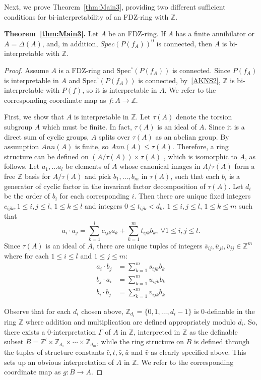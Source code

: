 \documentclass{article}
\theoremstyle{remark}
\def\Z{{\mathbb{Z}}}
\def\Spec{\text{Spec}}
\begin{document}
Next, we prove Theorem~\ref{thm:Main3}, providing two different sufficient conditions for bi-interpretability of an FDZ-ring with $\Z$.
\medskip


\noindent \textbf{Theorem~\ref{thm:Main3}.} Let $A$ be an FDZ-ring. If $A$ has a finite annihilator or $A=\Delta(A)$, and, in addition, $Spec(P(f_A))^0$ is connected, then $A$ is bi-interpretable with $\Z$.
\begin{proof} Assume $A$ is a FDZ-ring and $\Spec^\circ(P(f_A))$ is connected. Since $P(f_A)$ is interpretable in $A$ and $\Spec^\circ(P(f_A))$ is connected, by~\ref{AKNS2}, $\Z$ is bi-interpretable with $P(f)$, so it is interpretable in $A$. We refer to the corresponding coordinate map as $f:A\to \Z$. 

 First, we show that $A$ is interpretable in $\Z$. Let $\tau(A)$ denote the torsion subgroup $A$ which must be finite. In fact, $\tau(A)$ is an ideal of $A$. Since it is a direct sum of cyclic groups, $A$ splits over $\tau(A)$ as an abelian group. By assumption $Ann(A)$ is finite, so $Ann(A)\leq \tau(A)$. Therefore, a ring structure can be defined on $(A/\tau(A)) \times \tau(A)$ , which is isomorphic to $A$, as follows. Let $a_1, \ldots a_l$ be elements of $A$ whose canonical images in $A/\tau(A)$ form a free $\Z$ basis for $A/\tau(A)$ and pick $b_1, \ldots, b_m$ in $\tau(A)$, such that each $b_i$ is a generator of cyclic factor in the invariant factor decomposition of $\tau(A)$. Let $d_i$ be the order of $b_i$ for each corresponding $i$. Then there are unique fixed integers $c_{ijk}, 1\leq i,j\leq l$, $1\leq k \leq l$ and integers $0\leq t_{ijk}< d_k$,  $1\leq i,j\leq l$, $1\leq k \leq m$ such that
$$a_i\cdot a_j= \sum_{k=1}^l c_{ijk} a_k + \sum_{k=1}^m t_{ijk} b_k,~\forall 1\leq i,j\leq l.$$
Since $\tau(A)$ is an ideal of $A$, there are unique tuples of integers $\bar{s}_{ij},\bar{u}_{ji}, \bar{v}_{jj} \in \Z^m$ where for each $1\leq i\leq l$ and $1\leq j\leq m$:
\begin{align*} a_i\cdot b_j&=\sum_{k=1}^m s_{ijk} b_k\\
b_j\cdot a_i&=\sum_{k=1}^m u_{ijk} b_k\\
b_i\cdot b_j&=\sum_{k=1}^m v_{ijk}b_k \end{align*}

Observe that for each $d_i$ chosen above, $\Z_{d_i}=\{0,1,\ldots, d_i-1\}$ is 0-definable in the ring $\Z$ where addition and multiplication are defined appropriately modulo $d_i$. So, there exists a 0-interpretation $\Gamma$ of $A$ in $\Z$, interpreted in $\Z$ as the definable subset $B=\Z^l \times \Z_{d_1}\times \cdots \times \Z_{d_m}$, while the ring structure on $B$ is defined through the tuples of structure constants $\bar{c}, \bar{t}, \bar{s},\bar{u}$ and $\bar{v}$ as clearly specified above. This sets up an obvious interpretation of $A$ in $\Z$. We refer to the corresponding coordinate map as $g:B\to A$.


\end{proof}
\end{document}
